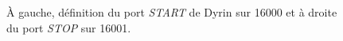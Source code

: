 \documentclass[a4paper,12pt,twoside]{book}
\begin{document}
 \begin{figure}[H]
  \centering
  \begin{subfigure}[b]{0.4\linewidth}
  \end{subfigure}
  \begin{subfigure}[b]{0.4\linewidth}
  \end{subfigure}
  \caption{À gauche, définition du port \textit{START} de Dyrin sur 16000 et à droite du port \textit{STOP} sur 16001.}
\end{figure}
\end{document}
